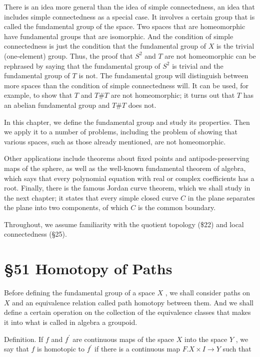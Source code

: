 There is an idea more general than the idea of simple connectedness, an idea that includes simple connectedness as a special case. It involves a certain group that is called the fundamental group of the space. Two spaces that are homeomorphic have fundamental groups that are isomorphic. And the condition of simple connectedness is just the condition that the fundamental group of \(X\) is the trivial (one-element) group. Thus, the proof that \({S}^{2}\) and \(T\) are not homeomorphic can be rephrased by saying that the fundamental group of \({S}^{2}\) is trivial and the fundamental group of \(T\) is not. The fundamental group will distinguish between more spaces than the condition of simple connectedness will. It can be used, for example, to show that \(T\) and \(T\# T\) are not homeomorphic; it turns out that \(T\) has an abelian fundamental group and \(T\# T\) does not.

In this chapter, we define the fundamental group and study its properties. Then we apply it to a number of problems, including the problem of showing that various spaces, such as those already mentioned, are not homeomorphic.

Other applications include theorems about fixed points and antipode-preserving maps of the sphere, as well as the well-known fundamental theorem of algebra, which says that every polynomial equation with real or complex coefficients has a root. Finally, there is the famous Jordan curve theorem, which we shall study in the next chapter; it states that every simple closed curve \(C\) in the plane separates the plane into two components, of which \(C\) is the common boundary.

Throughout, we assume familiarity with the quotient topology (\$22) and local connectedness (§25).

\section*{§51 Homotopy of Paths}

Before defining the fundamental group of a space \(X\) , we shall consider paths on \(X\) and an equivalence relation called path homotopy between them. And we shall define a certain operation on the collection of the equivalence classes that makes it into what is called in algebra a groupoid.

Definition. If \(f\) and \({f}^{\prime }\) are continuous maps of the space \(X\) into the space \(Y\) , we say that \(f\) is homotopic to \({f}^{\prime }\) if there is a continuous map \(F.X \times  I \rightarrow  Y\) such that

